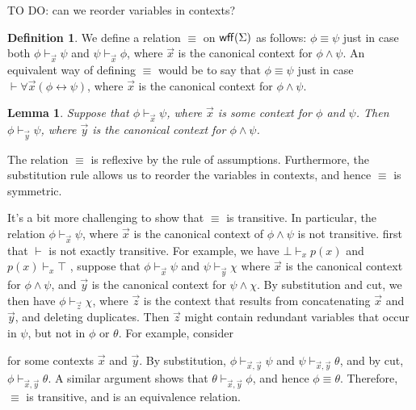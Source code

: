 \documentclass[10pt,fleqn]{article}
\newtheorem{lemma}[prop]{Lemma}
\theoremstyle{definition}
\newtheorem*{defn}{Definition}
\theoremstyle{remark}
\newcommand{\2}{\mathscr}
\begin{document}
TO DO: can we reorder variables in contexts?

\begin{defn} We define a relation $\equiv$ on $\mathsf{wff}(\Sigma )$ as follows:
  $\phi\equiv\psi$ just in case both $\phi\vdash _{\vec{x}}\psi$ and
  $\psi\vdash _{\vec{x}}\phi$, where $\vec{x}$ is the canonical
  context for $\phi\wedge\psi$.  An equivalent way of defining
  $\equiv$ would be to say that $\phi\equiv\psi$ just in case $\vdash
  \forall \vec{x}(\phi\leftrightarrow \psi)$, where $\vec{x}$ is the
  canonical context for $\phi\wedge\psi$.  \end{defn}


\begin{lemma} Suppose that $\phi\vdash _{\vec{x}}\psi$, where
  $\vec{x}$ is some context for $\phi$ and $\psi$.  Then $\phi\vdash
  _{\vec{y}}\psi$, where $\vec{y}$ is the canonical context for
  $\phi\wedge \psi$.  \end{lemma}



The relation $\equiv$ is reflexive by the rule of assumptions.
Furthermore, the substitution rule allows us to reorder the variables
in contexts, and hence $\equiv$ is symmetric.  

It's a bit more challenging to show that $\equiv$ is transitive.  In
particular, the relation $\phi\vdash _{\vec{x}}\psi$, where $\vec{x}$
is the canonical context of $\phi\wedge\psi$ is not transitive.  
first that $\vdash$ is not exactly transitive.  For example, we have
$\bot\vdash _xp(x)$ and $p(x)\vdash _x\top$ ,
suppose that $\phi \vdash _{\vec{x}}\psi$ and $\psi\vdash
_{\vec{y}}\chi$ where $\vec{x}$ is the canonical context for
$\phi\wedge\psi$, and $\vec{y}$ is the canonical context for
$\psi\wedge\chi$.  By substitution and cut, we then have $\phi\vdash
_{\vec{z}}\chi$, where $\vec{z}$ is the context that results from
concatenating $\vec{x}$ and $\vec{y}$, and deleting duplicates.  Then
$\vec{z}$ might contain redundant variables that occur in $\psi$, but
not in $\phi$ or $\theta$.  For example, consider

for some contexts $\vec{x}$ and $\vec{y}$.  By substitution,
$\phi\vdash _{\vec{x},\vec{y}}\psi$ and $\psi\vdash
_{\vec{x},\vec{y}}\theta$, and by cut, $\phi\vdash
_{\vec{x},\vec{y}}\theta$.  A similar argument shows that $\theta
\vdash_{\vec{x},\vec{y}}\phi$, and hence $\phi\equiv \theta$.
Therefore, $\equiv$ is transitive, and is an equivalence relation.
\end{document}
